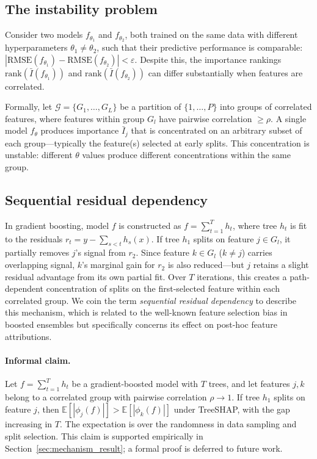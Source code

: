 \documentclass[11pt]{article}
\newcommand{\rhovar}{\rho}
\begin{document}
\subsection{The instability problem}

Consider two models $f_{\theta_1}$ and $f_{\theta_2}$, both trained on the
same data with different hyperparameters $\theta_1 \neq \theta_2$, such
that their predictive performance is comparable:
$|\text{RMSE}(f_{\theta_1}) - \text{RMSE}(f_{\theta_2})| < \varepsilon$.
Despite this, the importance rankings
$\text{rank}(\bar{I}(f_{\theta_1}))$ and
$\text{rank}(\bar{I}(f_{\theta_2}))$ can differ substantially when
features are correlated.

Formally, let $\mathcal{G} = \{G_1, \ldots, G_L\}$ be a partition of
$\{1, \ldots, P\}$ into groups of correlated features, where features
within group $G_l$ have pairwise correlation $\geq \rhovar$. A single
model $f_\theta$ produces importance $\bar{I}_j$ that is concentrated on
an arbitrary subset of each group---typically the feature(s) selected at
early splits. This concentration is unstable: different $\theta$ values
produce different concentrations within the same group.

\subsection{Sequential residual dependency}

In gradient boosting, model $f$ is constructed as $f =
\sum_{t=1}^{T} h_t$, where tree $h_t$ is fit to the residuals
$r_t = y - \sum_{s<t} h_s(x)$. If tree $h_1$ splits on feature $j \in
G_l$, it partially removes $j$'s signal from $r_2$. Since feature $k
\in G_l$ ($k \neq j$) carries overlapping signal, $k$'s marginal gain
for $r_2$ is also reduced---but $j$ retains a slight residual advantage
from its own partial fit. Over $T$ iterations, this creates a
path-dependent concentration of splits on the first-selected feature
within each correlated group. We coin the term \emph{sequential residual
dependency} to describe this mechanism, which is related to the
well-known feature selection bias in boosted ensembles but specifically
concerns its effect on post-hoc feature attributions.

\paragraph{Informal claim.}
Let $f = \sum_{t=1}^{T} h_t$ be a gradient-boosted model with $T$
trees, and let features $j, k$ belong to a correlated group with
pairwise correlation $\rhovar \to 1$. If tree $h_1$ splits on feature
$j$, then $\mathbb{E}[|\phi_j(f)|] > \mathbb{E}[|\phi_k(f)|]$ under
TreeSHAP, with the gap increasing in $T$. The expectation is over the
randomness in data sampling and split selection. This claim is supported
empirically in Section~\ref{sec:mechanism_result}; a formal proof is
deferred to future work.
\end{document}
